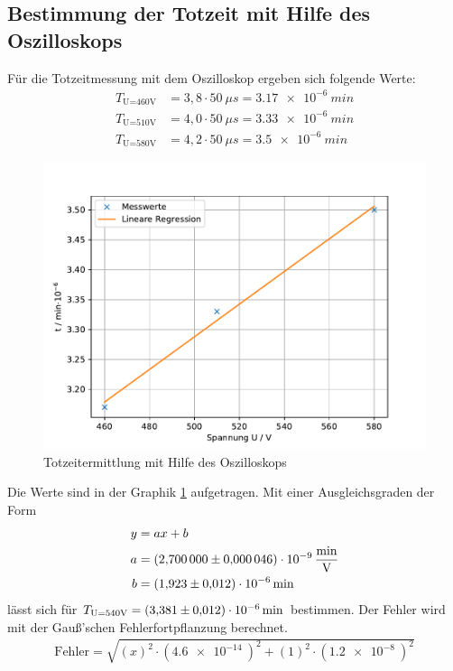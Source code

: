 \subsection{Bestimmung der Totzeit mit Hilfe des Oszilloskops}
Für die Totzeitmessung mit dem Oszilloskop ergeben sich folgende Werte:
\begin{align*}
  T_{\text{U=460V}}&=3,8\cdot50\SI{}{\mu s}=\SI{3,17e-6}{min}\\
  T_{\text{U=510V}}&=4,0\cdot50\SI{}{\mu s}=\SI{3,33e-6}{min}\\
  T_{\text{U=580V}}&=4,2\cdot50\SI{}{\mu s}=\SI{3,5e-6}{min}
\end{align*}
\begin{figure}[h!]
  \centering
  \includegraphics[width=\textwidth]{Totzeit2.pdf}
  \caption{Totzeitermittlung mit Hilfe des Oszilloskops}
  \label{fig:TotzeitOsz}
\end{figure}
Die Werte sind in der Graphik \ref{fig:TotzeitOsz} aufgetragen.
Mit einer Ausgleichsgraden der Form
\begin{align*}
  y&=ax+b\\
  a&=\SI{2,7\pm0,000046e-9}{\frac{min}{V}}\\
  b&=\SI{1,923\pm0,012e-6}{min}
\end{align*}
lässt sich für $T_{\text{U=540V}}=\SI{3,381\pm0,012e-6}{min}$ bestimmen.
Der Fehler wird mit der Gauß'schen Fehlerfortpflanzung berechnet.
\begin{align*}
  \text{Fehler}=\sqrt{ \left(x\right)^2\cdot(\SI{4,6e-14}{})^2+\left(1\right)^2\cdot(\SI{1,2e-8}{})^2}
\end{align*}

